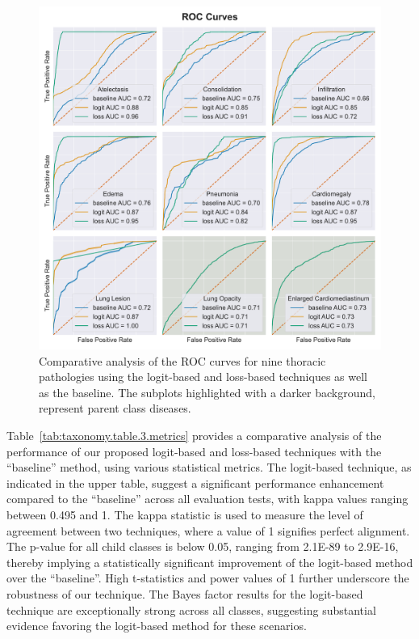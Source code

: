 \documentclass[review,1p,times,numbers]{elsarticle}
\begin{document}
\begin{figure}[htbp]
    \centering
    \includegraphics[width=\textwidth]{figures/roc_curve_all_datasets/ROC/roc_curve_all_datasets.pdf}
    \caption[Comparative Analysis of ROC Curves for Nine Thoracic Pathologies: logit-based, loss-based, and ``baseline'' Techniques]{Comparative analysis of the ROC curves for nine thoracic pathologies using the logit-based and loss-based techniques as well as the baseline. The subplots highlighted with a darker background, represent parent class diseases.}\label{fig:taxonomy.fig.3.roc_curve_all_datasets}
\end{figure}

Table~\ref{tab:taxonomy.table.3.metrics} provides a comparative analysis of the performance of our proposed logit-based and loss-based techniques with the ``baseline'' method, using various statistical metrics. The logit-based technique, as indicated in the upper table, suggest a significant performance enhancement compared to the ``baseline'' across all evaluation tests, with kappa values ranging between 0.495 and 1. The kappa statistic is used to measure the level of agreement between two techniques, where a value of 1 signifies perfect alignment. The p-value for all child classes is below 0.05, ranging from 2.1E-89 to 2.9E-16, thereby implying a statistically significant improvement of the logit-based method over the ``baseline''. High t-statistics and power values of 1 further underscore the robustness of our technique. The Bayes factor results for the logit-based technique are exceptionally strong across all classes, suggesting substantial evidence favoring the logit-based method for these scenarios.
\end{document}
